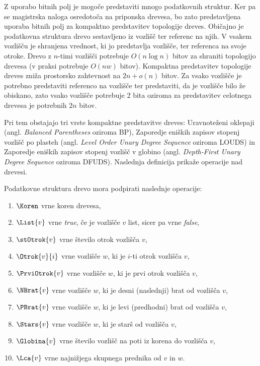 Z uporabo bitnih polj je mogoče predstaviti mnogo podatkovnih struktur. Ker pa se magistrska naloga osredotoča na priponska drevesa, bo zato predstavljena uporaba bitnih polj za kompaktno predstavitev topologije dreves. Običajno je podatkovna struktura drevo sestavljeno iz vozlišč ter referenc  na njih. V vsakem vozlišču je shranjena vrednost, ki jo predstavlja vozlišče, ter referenca na svoje otroke. Drevo z $n$-timi vozlišči potrebuje $O(n\log{n})$ bitov za shraniti topologijo drevesa (v praksi potrebuje $O(nw)$ bitov). Kompaktna predstavitev topologije dreves zniža prostorsko zahtevnost na $2n+o(n)$ bitov. Za vsako vozlišče je potrebno predstaviti referenco na vozlišče ter predstaviti, da je vozlišče bilo že obiskano, zato vsako vozlišče potrebuje 2 bita oziroma za predstavitev celotnega drevesa je potrebnih $2n$ bitov.

Pri tem obstajajo tri vrste kompaktne predstavitve dreves: Uravnoteženi oklepaji (angl. \textit{Balanced Parentheses} oziroma BP), Zaporedje eniških zapisov stopenj vozlišč po plasteh (angl. \textit{Level Order Unary Degree Sequence} oziroma LOUDS) in Zaporedje eniških zapisov stopenj vozlišč v globino (angl. \textit{Depth-First Unary Degree Sequence} oziroma DFUDS). Naslednja definicija prikaže operacije nad drevesi.


\begin{defi}\label{def:drevo}
    Podatkovne struktura drevo mora podpirati naslednje operacije:
    \begin{enumerate}
        \item $\Koren$ vrne koren drevesa,
        \item $\List{v}$ vrne \textit{true}, če je vozlišče $v$ list, sicer pa vrne \textit{false},
        \item $\stOtrok{v}$ vrne število otrok vozlišča $v$,
        \item $\Otrok{v}{i}$ vrne vozlišče $w$, ki je $i$-ti otrok vozlišča $v$,
        \item $\PrviOtrok{v}$ vrne vozlišče $w$, ki je prvi otrok vozlišča $v$,
        \item $\NBrat{v}$ vrne vozlišče $w$, ki je desni (naslednji) brat od vozlišča $v$,
        \item $\PBrat{v}$ vrne vozlišče $w$, ki je levi (predhodni) brat od vozlišča $v$,
        \item $\Stars{v}$ vrne vozlišče $w$, ki je starš od vozlišča $v$,
        \item $\Globina{v}$ vrne število vozlišč na poti iz korena do vozlišča $v$, %
        \item $\Lca{v}$ vrne najnižjega skupnega prednika od $v$ in $w$.
    \end{enumerate}
\end{defi}



